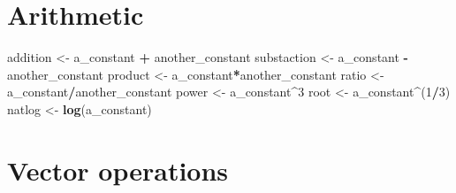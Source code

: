 \documentclass[]{article}
\newenvironment{Shaded}{\begin{snugshade}}{\end{snugshade}}
\newcommand{\KeywordTok}[1]{\textcolor[rgb]{0.13,0.29,0.53}{\textbf{#1}}}
\newcommand{\DecValTok}[1]{\textcolor[rgb]{0.00,0.00,0.81}{#1}}
\newcommand{\StringTok}[1]{\textcolor[rgb]{0.31,0.60,0.02}{#1}}
\newcommand{\OperatorTok}[1]{\textcolor[rgb]{0.81,0.36,0.00}{\textbf{#1}}}
\newcommand{\NormalTok}[1]{#1}
\begin{document}
\section{Arithmetic}\label{arithmetic}

\begin{Shaded}
\begin{Highlighting}[]
\NormalTok{addition    <-}\StringTok{ }\NormalTok{a_constant }\OperatorTok{+}\StringTok{ }\NormalTok{another_constant}
\NormalTok{substaction <-}\StringTok{ }\NormalTok{a_constant }\OperatorTok{-}\StringTok{ }\NormalTok{another_constant}
\NormalTok{product     <-}\StringTok{ }\NormalTok{a_constant}\OperatorTok{*}\NormalTok{another_constant}
\NormalTok{ratio       <-}\StringTok{ }\NormalTok{a_constant}\OperatorTok{/}\NormalTok{another_constant}
\NormalTok{power       <-}\StringTok{ }\NormalTok{a_constant}\OperatorTok{^}\DecValTok{3}
\NormalTok{root        <-}\StringTok{ }\NormalTok{a_constant}\OperatorTok{^}\NormalTok{(}\DecValTok{1}\OperatorTok{/}\DecValTok{3}\NormalTok{)}
\NormalTok{natlog      <-}\StringTok{ }\KeywordTok{log}\NormalTok{(a_constant)}
\end{Highlighting}
\end{Shaded}

\section{Vector operations}\label{vector-operations}
\end{document}
